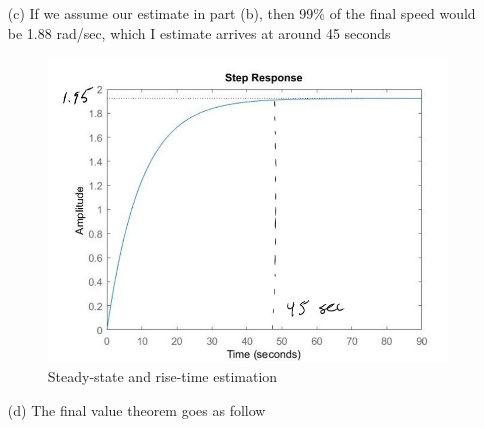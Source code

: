 \documentclass{article}
\begin{document}
\begin{itemize}
    \item[(c)]
    If we assume our estimate in part (b), then 99\% of the final speed would be 1.88 rad/sec, which I estimate arrives at around 45 seconds
    \begin{figure}[!htb]
        \centering
        \includegraphics[width=.6\linewidth]{Step(c).JPG}
        \caption{Steady-state and rise-time estimation}
        \label{fig:stepc}
    \end{figure}

    \item[(d)] The final value theorem goes as follow


\end{itemize}
\end{document}

